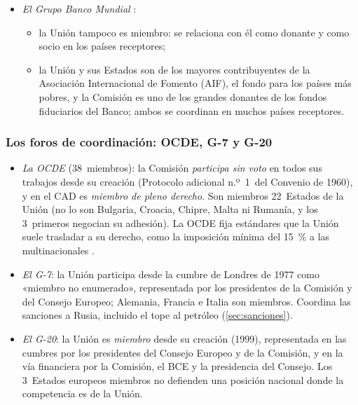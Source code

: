 \documentclass[11pt]{article}
\begin{document}
\begin{itemize}
\begin{itemize}
  \item el euro forma parte de la cesta de los derechos especiales de giro desde 1999, con el segundo mayor peso tras el dólar.
  \end{itemize}
\item \emph{El Grupo Banco Mundial} :
  \begin{itemize}
  \item la Unión tampoco es miembro: se relaciona con él como donante y como socio en los países receptores;
  \item la Unión y sus Estados son de los mayores contribuyentes de la Asociación Internacional de Fomento (AIF), el fondo para los países más pobres, y la Comisión es uno de los grandes donantes de los fondos fiduciarios del Banco; ambos se coordinan en muchos países receptores.
  \end{itemize}
\end{itemize}

\subsubsection{Los foros de coordinación: OCDE, G-7 y G-20}\label{sec:org-foros}

\begin{itemize}
\item \emph{La OCDE} (38~miembros): la Comisión \emph{participa sin voto} en todos sus trabajos desde su creación (Protocolo adicional n.º~1~del Convenio de 1960), y en el CAD es \emph{miembro de pleno derecho}. Son miembros 22~Estados de la Unión (no lo son Bulgaria, Croacia, Chipre, Malta ni Rumanía, y los 3~primeros negocian su adhesión). La OCDE fija estándares que la Unión suele trasladar a su derecho, como la imposición mínima del 15~\% a las multinacionales .
\item \emph{El G-7}: la Unión participa desde la cumbre de Londres de 1977 como «miembro no enumerado», representada por los presidentes de la Comisión y del Consejo Europeo; Alemania, Francia e Italia son miembros. Coordina las sanciones a Rusia, incluido el tope al petróleo (\ref{sec:sanciones}).
\item \emph{El G-20}: la Unión es \emph{miembro} desde su creación (1999), representada en las cumbres por los presidentes del Consejo Europeo y de la Comisión, y en la vía financiera por la Comisión, el BCE y la presidencia del Consejo. Los 3~Estados europeos miembros no defienden una posición nacional donde la competencia es de la Unión.
\end{itemize}
\end{document}
